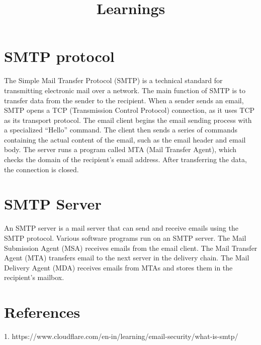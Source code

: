 \documentclass{article}
\title{Learnings}
\begin{document}
\section{SMTP protocol}

The Simple Mail Transfer Protocol (SMTP) is a technical standard for transmitting electronic mail over a network.
The main function of SMTP is to transfer data from the sender to the recipient.
When a sender sends an email, SMTP opens a TCP (Transmission Control Protocol) connection, as it uses TCP as its transport protocol.
The email client begins the email sending process with a specialized ``Hello'' command.
The client then sends a series of commands containing the actual content of the email, such as the email header and email body.
The server runs a program called MTA (Mail Transfer Agent), which checks the domain of the recipient's email address. After transferring the data, the connection is closed.

\section{SMTP Server}

An SMTP server is a mail server that can send and receive emails using the SMTP protocol.
Various software programs run on an SMTP server. The Mail Submission Agent (MSA) receives emails from the email client.
The Mail Transfer Agent (MTA) transfers email to the next server in the delivery chain.
The Mail Delivery Agent (MDA) receives emails from MTAs and stores them in the recipient's mailbox.


\section{References}

1. https://www.cloudflare.com/en-in/learning/email-security/what-is-smtp/
\end{document}

